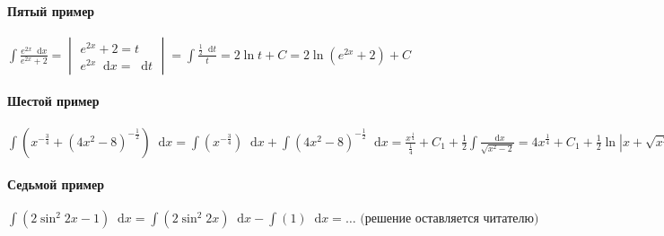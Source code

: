 \documentclass{article}
\newcommand*\diff{\mathop{}\!\mathrm{d}}
\begin{document}
\paragraph{Пятый пример}

$\int \frac{e^{2 x} \diff x}{e^{2 x} + 2} = \begin{vmatrix}
    e^{2 x} + 2 = t \\
    e^{2 x} \diff x = \diff t
\end{vmatrix} = \int \frac{\frac{1}{2} \diff t}{t} = 2 \ln t + C = 2 \ln (e^{2 x} + 2) + C$

\paragraph{Шестой пример}

$\int (x^{-\frac{3}{4}} + (4x^2 - 8)^{-\frac{1}{2}}) \diff x = \int (x^{-\frac{3}{4}}) \diff x + \int (4x^2 - 8)^{-\frac{1}{2}} \diff x = \frac{x^{\frac{1}{4}}}{\frac{1}{4}} + C_1 + \frac{1}{2} \int \frac{\diff x}{\sqrt{x^2 - 2}} = 4 x^{\frac{1}{4}} + C_1 + \frac{1}{2} \ln |x + \sqrt{x^2 - 2}| + C_2 = 4 \sqrt{x} + \frac{1}{2} \ln |x + \sqrt{x^2 - 2}| + C$

\paragraph{Седьмой пример}

$\int (2 \sin^2 2x - 1) \diff x = \int (2 \sin^2 2x) \diff x - \int (1) \diff x = \dots \text{ (решение оставляется читателю)}$
\end{document}
